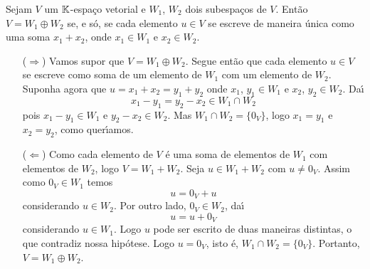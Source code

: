 \begin{proposicao}
    Sejam $V$ um $\mathbb{K}$-espa\c{c}o vetorial e $W_1$, $W_2$ dois subespa\c{c}os de $V$. Ent\~ao $V = W_1 \oplus W_2$ se, e s\'o, se
    cada elemento $u \in V$ se escreve de maneira \'unica como uma soma $x_1 + x_2$, onde $x_1 \in W_1$ e $x_2 \in W_2$.
\end{proposicao}
\begin{prova}
    \begin{itemize}
        \item[($\Rightarrow$)] Vamos supor que $V = W_1 \oplus W_2.$ Segue ent\~ao que cada elemento $u \in V$ se escreve
        como soma de um elemento de $W_1$ com um elemento de $W_2$. Suponha agora que $u = x_1 + x_2 = y_1 + y_2$ onde
        $x_1$, $y_1 \in W_1$ e $x_2$, $y_2 \in W_2$. Da{\'\i}
        \[
            x_1 - y_1 = y_2 - x_2 \in W_1 \cap W_2
        \]
        pois $x_1 - y_1 \in W_1$ e $y_2 - x_2 \in W_2$. Mas $W_1 \cap W_2 = \{0_V\}$, logo $x_1 = y_1$ e $x_2 = y_2$,
        como quer{\'\i}amos.
        \item[($\Leftarrow$)] Como cada elemento de $V$ \'e uma soma de elementos de $W_1$ com elementos de $W_2$, logo
        $V = W_1 + W_2$. Seja $u \in W_1 + W_2$ com $u \ne 0_V$. Assim como $0_V \in W_1$ temos
        \[
            u = 0_V + u
        \]
        considerando $u \in W_2$. Por outro lado, $0_V \in W_2$, da{\'\i}
        \[
            u = u + 0_V
        \]
        considerando $u \in W_1$. Logo $u$ pode ser escrito de duas maneiras distintas, o que contradiz nossa hip\'otese.
        Logo $u = 0_V$, isto \'e, $W_1 \cap W_2 = \{0_V\}$. Portanto, $V = W_1 \oplus W_2$.
    \end{itemize}
\end{prova}

